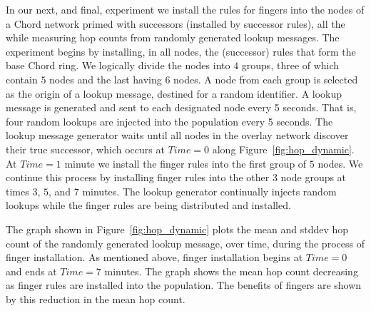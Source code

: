 \documentclass[12pt]{article}
\begin{document}
{In our next, and final, experiment we install the rules for fingers into the nodes of a Chord network primed with
successors (installed by successor rules), all the while measuring hop counts from randomly 
generated lookup messages. The experiment begins
by installing, in all nodes, the (successor) rules that form the base Chord ring. We logically 
divide the nodes into $4$ groups, three of which contain $5$ nodes and the last having 
$6$ nodes. A node from each group is selected as the origin of a lookup message, destined 
for a random identifier. A lookup message is generated and sent to each designated node
every 5 seconds. That is, four random lookups are injected into the population every 5 seconds. 
The lookup message generator waits until all nodes in the overlay network discover their true successor, which occurs at $Time=0$ along Figure~\ref{fig:hop_dynamic}. At $Time=1$ minute we install the finger
rules into the first group of $5$ nodes. We continue this process by installing finger rules into 
the other $3$ node groups at times $3$, $5$, and $7$ minutes. The lookup generator continually 
injects random lookups while the finger rules are being distributed and installed.

The graph shown in Figure~\ref{fig:hop_dynamic} plots the mean and stddev hop count of 
the randomly generated lookup message, over time, during the process of finger installation. 
As mentioned above, finger installation begins at $Time=0$ and ends at $Time=7$ minutes.
The graph shows the mean hop count decreasing as finger rules are installed into the population.
The benefits of fingers are shown by this reduction in the mean hop count.
 }


\end{document}
